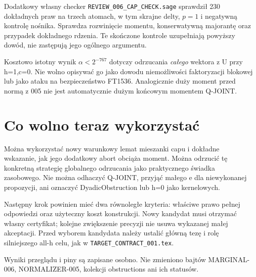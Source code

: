 \documentclass[11pt,a4paper]{article}
\newcommand{\code}[1]{\nolinkurl{#1}}
\begin{document}
Dodatkowy własny checker \code{REVIEW_006_CAP_CHECK.sage} sprawdził
230 dokładnych praw na trzech atomach, w tym skrajne delty, $p=1$
i negatywną kontrolę nośnika. Sprawdza rozwinięcie momentu, konserwatywną
majorantę oraz przypadek dokładnego rdzenia. Te skończone kontrole
uzupełniają powyższy dowód, nie zastępują jego ogólnego argumentu.

Kosztowo istotny wynik $\alpha<2^{-767}$ dotyczy odrzucania \emph{całego}
wektora z U przy h=1,c=0. Nie wolno opisywać go jako dowodu niemożliwości
faktoryzacji blokowej lub jako ataku na bezpieczeństwo FT1536.
Analogicznie duży moment przed normą z 005 nie jest automatycznie
dużym końcowym momentem Q-JOINT.

\section{Co wolno teraz wykorzystać}
Można wykorzystać nowy warunkowy lemat mieszanki capu i dokładne wskazanie,
jak jego dodatkowy abort obciąża moment. Można odrzucić tę konkretną
strategię globalnego odrzucania jako praktycznego świadka zasobowego.
Nie można odhaczyć Q-JOINT, przyjąć małego e dla niewykonanej propozycji,
ani oznaczyć DyadicObstruction lub h=0 jako kernelowych.

Następny krok powinien mieć dwa równoległe kryteria: właściwe prawo
pełnej odpowiedzi oraz użyteczny koszt konstrukcji. Nowy kandydat musi
otrzymać własny certyfikat; kolejne zwiększenie precyzji nie usuwa
wykazanej małej akceptacji. Przed wyborem kandydata należy ustalić
główną tezę i rolę silniejszego all-h celu, jak w
\code{TARGET_CONTRACT_001.tex}.

Wyniki przeglądu i piny są zapisane osobno. Nie zmieniono bajtów
MARGINAL-006, NORMALIZER-005, kolekcji obstructions ani ich statusów.
\end{document}
